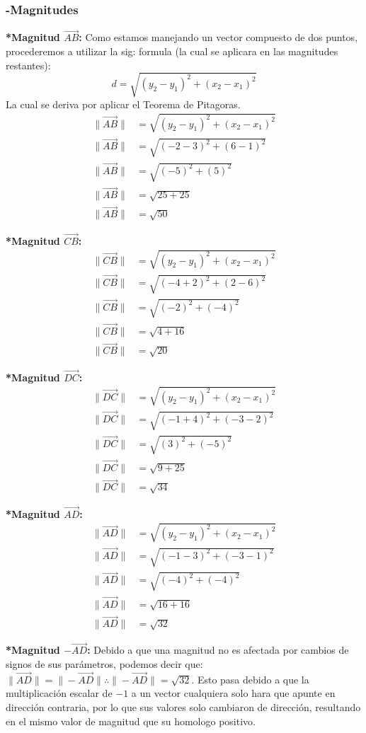\documentclass[letterpaper, 12pt]{article}
\begin{document}
\subsubsection*{-Magnitudes}
\begin{justify}
\textbf{*Magnitud \(\vec{AB}\):}
\justify
Como estamos manejando un vector compuesto de dos puntos, procederemos a utilizar la sig: formula (la cual se aplicara en las magnitudes restantes):
\[d=\sqrt{(y_2-y_1)^2+(x_2-x_1)^2}\]
La cual se deriva por aplicar el Teorema de Pitagoras.
\begin{align*}
\|\vec{AB}\|&=\sqrt{(y_2-y_1)^2+(x_2-x_1)^2}\\
\|\vec{AB}\|&=\sqrt{(-2-3)^2+(6-1)^2}\\
\|\vec{AB}\|&=\sqrt{(-5)^2+(5)^2}\\
\|\vec{AB}\|&=\sqrt{25+25}\\
\|\vec{AB}\|&=\sqrt{50}
\end{align*}

\justify
\textbf{*Magnitud \(\vec{CB}\):}
\begin{align*}
    \|\vec{CB}\|&=\sqrt{(y_2-y_1)^2+(x_2-x_1)^2}\\
    \|\vec{CB}\|&=\sqrt{(-4+2)^2+(2-6)^2}\\
    \|\vec{CB}\|&=\sqrt{(-2)^2+(-4)^2}\\
    \|\vec{CB}\|&=\sqrt{4+16}\\
    \|\vec{CB}\|&=\sqrt{20}
\end{align*}

\justify
\textbf{*Magnitud \(\vec{DC}\):}
\begin{align*}
    \|\vec{DC}\|&=\sqrt{(y_2-y_1)^2+(x_2-x_1)^2}\\
    \|\vec{DC}\|&=\sqrt{(-1+4)^2+(-3-2)^2}\\
    \|\vec{DC}\|&=\sqrt{(3)^2+(-5)^2}\\
    \|\vec{DC}\|&=\sqrt{9+25}\\
    \|\vec{DC}\|&=\sqrt{34}
\end{align*}

\justify
\textbf{*Magnitud \(\vec{AD}\):}
\begin{align*} 
    \|\vec{AD}\|&=\sqrt{(y_2-y_1)^2+(x_2-x_1)^2}\\
    \|\vec{AD}\|&=\sqrt{(-1-3)^2+(-3-1)^2}\\
    \|\vec{AD}\|&=\sqrt{(-4)^2+(-4)^2}\\
    \|\vec{AD}\|&=\sqrt{16+16}\\
    \|\vec{AD}\|&=\sqrt{32}
\end{align*}

\justify
\textbf{*Magnitud \(-\vec{AD}\):}
\justify
Debido a que una magnitud no es afectada por cambios de signos de sus parámetros, podemos decir que: \(\|\vec{AD}\|=\|-\vec{AD}\| \therefore \|-\vec{AD}\|=\sqrt{32}\).
Esto pasa debido a que la multiplicación escalar de \(-1\) a un vector cualquiera solo hara que apunte en dirección contraria, por lo que sus valores solo cambiaron de dirección, resultando
en el mismo valor de magnitud que su homologo positivo.
\end{justify}
\end{document}
